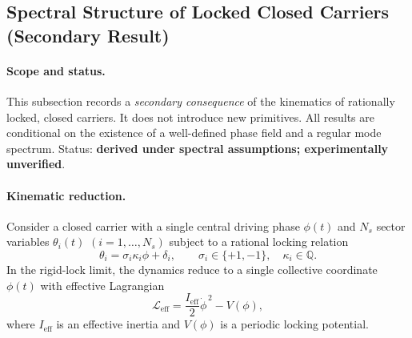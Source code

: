 \documentclass[11pt]{article}
\theoremstyle{definition}
\theoremstyle{plain}
\theoremstyle{remark}
\begin{document}
\subsection{Spectral Structure of Locked Closed Carriers (Secondary Result)}
    \label{subsec:spectral_locked_carriers}
    
    \paragraph{Scope and status.}
        This subsection records a \emph{secondary consequence} of the kinematics of rationally locked, closed carriers. It does not introduce new primitives. All results are conditional on the existence of a well-defined phase field and a regular mode spectrum. Status: \textbf{derived under spectral assumptions; experimentally unverified}.

    \paragraph{Kinematic reduction.}
        Consider a closed carrier with a single central driving phase $\phi(t)$ and $N_s$ sector variables $\theta_i(t)$ $(i=1,\dots,N_s)$ subject to a rational locking relation
        \begin{equation}
            \theta_i = \sigma_i \kappa_i \phi + \delta_i,
            \qquad
            \sigma_i \in \{+1,-1\},\quad \kappa_i \in \mathbb{Q}.
            \label{eq:locking_relation}
        \end{equation}
        In the rigid-lock limit, the dynamics reduce to a single collective coordinate $\phi(t)$ with effective Lagrangian
        \begin{equation}
            \mathcal{L}_{\mathrm{eff}}
            =
            \frac{I_{\mathrm{eff}}}{2}\dot{\phi}^{\,2}
            -
            V(\phi),
            \label{eq:Leff_canonical}
        \end{equation}
        where $I_{\mathrm{eff}}$ is an effective inertia and $V(\phi)$ is a periodic locking potential.
\end{document}
